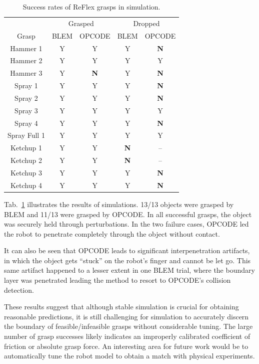 \begin{table}[hbt]
   \begin{center}
   \begin{tabular}{| c | c  c | c c |}
   \hline
         & \multicolumn{2}{c}{Grasped} & \multicolumn{2}{c}{Dropped} \\
   Grasp & BLEM & OPCODE & BLEM & OPCODE\\
   \cline{1-5}
   Hammer 1 & Y & Y & Y & {\bf N} \\
   Hammer 2 & Y & Y & Y & Y \\
   Hammer 3 & Y & {\bf N} & Y & {\bf N} \\
   Spray 1  & Y & Y & Y & {\bf N} \\
   Spray 2  & Y & Y & Y & {\bf N} \\
   Spray 3  & Y & Y & Y & Y \\
   Spray 4  & Y & Y & Y & {\bf N} \\
   Spray Full 1 & Y & Y & Y & Y \\
   Ketchup 1    & Y & Y & {\bf N} & -- \\
   Ketchup 2    & Y & Y & {\bf N} & -- \\
   Ketchup 3    & Y & Y & Y & {\bf N} \\
   Ketchup 4    & Y & Y & Y & {\bf N} 
   \\\hline
   \end{tabular}
   \end{center}
   \caption{Success rates of ReFlex grasps in simulation.}
   \label{table:GraspSuccess}
\end{table}

Tab.~\ref{table:GraspSuccess} illustrates the results of simulations. 13/13 objects were grasped by BLEM and 11/13 were grasped by OPCODE. In all successful grasps, the object was securely held through perturbations.  In the two failure cases, OPCODE led the robot to penetrate completely through the object without contact.  

It can also be seen that OPCODE leads to significant interpenetration artifacts, in which the object gets ``stuck'' on the robot's finger and cannot be let go.  This same artifact happened to a lesser extent in one BLEM trial, where the boundary layer was penetrated leading the method to resort to OPCODE's collision detection.

These results suggest that although stable simulation is crucial for obtaining reasonable predictions, it is still challenging for simulation to accurately discern the boundary of feasible/infeasible grasps without considerable tuning.  The large number of grasp successes likely indicates an improperly calibrated coefficient of friction or absolute grasp force. An interesting area for future work would be to automatically tune the robot model to obtain a match with physical experiments.

